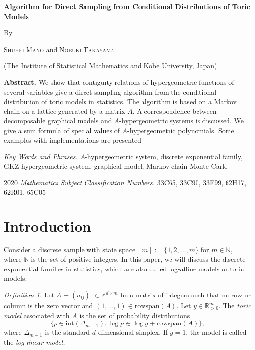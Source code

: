 \documentclass[a4paper,12pt]{article}
\theoremstyle{plain}
\theoremstyle{remark}
\newtheorem{definition}[theorem]{Definition}
\begin{document}
\begin{center}

  \Large
  {\bf Algorithm for Direct Sampling from
    Conditional Distributions of Toric Models}
  \normalsize

  \bigskip By \bigskip

  \textsc{Shuhei Mano} and \textsc{Nobuki Takayama}

  \smallskip
  
  (The Institute of Statistical Mathematics and
   Kobe University, Japan)


\end{center}

\small

{\bf Abstract.}
We show that contiguity relations of hypergeometric functions
of several variables give a direct sampling algorithm from
the conditional distribution of toric models in statistics.
The algorithm is based on a Markov chain on a lattice
generated by a matrix $A$. A correspondence between decomposable
graphical models and $A$-hypergeometric systems is discussed.
We give a sum formula of special values of $A$-hypergeometric
polynomials. Some examples with implementations are presented.

\smallskip

{\it Key Words and Phrases.}
$A$-hypergeometric system, discrete exponential family,
GKZ-hypergeometric system, graphical model, Markov chain
Monte Carlo

\smallskip

2020 {\it Mathematics Subject Classification Numbers.}
33C65, 33C90, 33F99, 62H17, 62R01, 65C05

\normalsize

\section{Introduction}
\label{sect:intr}

Consider a discrete sample with state space $[m]:=\{1,2,\ldots,m\}$
for $m\in\mathbb{N}$, where $\mathbb{N}$ is the set of positive
integers. In this paper, we will discuss the discrete exponential
families in statistics, which are also called log-affine models
or toric models.

\begin{definition}\label{defi:toric}
  Let $A=(a_{ij})$ $\in \mathbb{Z}^{d\times m}$ be a matrix of
  integers such that no row or column is the zero vector and
  $(1,\ldots,1)\in \text{rowspan}(A)$. Let
  $y\in\mathbb{R}^m_{>0}$. The {\it toric model} associated
  with $A$ is the set of probability distributions 
  \[
    \{p\in\text{int}(\Delta_{m-1}):
      \log p \in \log y+\text{rowspan}(A)\},
  \]
  where $\Delta_{m-1}$ is the standard $d$-dimensional simplex.
  If $y=1$, the model is called the {\it log-linear model.}  
\end{definition}
\end{document}
